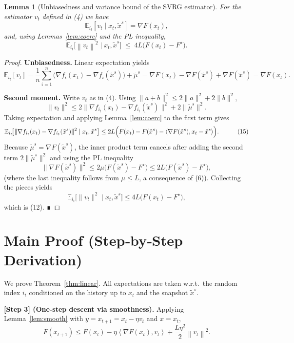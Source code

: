 \documentclass{article}
\newtheorem{lemma}{Lemma}
\newcommand{\E}{\mathbb{E}}
\newcommand{\norm}[1]{\left\|#1\right\|}
\newcommand{\inner}[2]{\left\langle #1,#2\right\rangle}
\begin{document}
\begin{lemma}[Unbiasedness and variance bound of the SVRG estimator]\label{lem:var}
For the estimator $v_t$ defined in (4) we have
\[
\E_{i_t}[v_t\mid x_t,\tilde{x}^{s}]=\nabla F(x_t),
\tag{11}
\]
and, using Lemmas~\ref{lem:coerc} and the PL inequality,
\[
\E_{i_t}\!\bigl[\norm{v_t}^{2}\mid x_t,\tilde{x}^{s}\bigr]
\;\le\;4L\bigl(F(x_t)-F^{\star}\bigr).
\tag{12}
\]
\end{lemma}
\begin{proof}
\textbf{Unbiasedness.}  Linear expectation yields
\[
\E_{i_t}[v_t]
 =\frac{1}{n}\sum_{i=1}^{n}\bigl(\nabla f_i(x_t)-\nabla f_i(\tilde{x}^{s})\bigr)+\tilde{\mu}^{s}
 =\nabla F(x_t)-\nabla F(\tilde{x}^{s})+\nabla F(\tilde{x}^{s})
 =\nabla F(x_t).
\tag{13}
\]

\textbf{Second moment.}  Write $v_t$ as in (4).  Using $\|a+b\|^{2}\le2\|a\|^{2}+2\|b\|^{2}$,
\[
\|v_t\|^{2}\le 2\|\nabla f_{i_t}(x_t)-\nabla f_{i_t}(\tilde{x}^{s})\|^{2}
          +2\|\tilde{\mu}^{s}\|^{2}.
\tag{14}
\]
Taking expectation and applying Lemma~\ref{lem:coerc} to the first term gives
\[
\begin{aligned}
\E_{i_t}\!\bigl[\|\nabla f_{i_t}(x_t)-\nabla f_{i_t}(\tilde{x}^{s})\|^{2}\mid x_t,\tilde{x}^{s}\bigr]
 &\le 2L\Bigl(F(x_t)-F(\tilde{x}^{s})
      -\inner{\nabla F(\tilde{x}^{s})}{x_t-\tilde{x}^{s}}\Bigr).
\end{aligned}
\tag{15}
\]
Because $\tilde{\mu}^{s}=\nabla F(\tilde{x}^{s})$, the inner product term cancels after adding the second term $2\|\tilde{\mu}^{s}\|^{2}$ and using the PL inequality
\[
\|\nabla F(\tilde{x}^{s})\|^{2}\le 2\mu\bigl(F(\tilde{x}^{s})-F^{\star}\bigr)
\le 2L\bigl(F(\tilde{x}^{s})-F^{\star}\bigr),
\tag{16}
\]
(where the last inequality follows from $\mu\le L$, a consequence of (6)).  
Collecting the pieces yields
\[
\E_{i_t}\!\bigl[\|v_t\|^{2}\mid x_t,\tilde{x}^{s}\bigr]
\le 4L\bigl(F(x_t)-F^{\star}\bigr),
\]
which is (12).  ∎
\end{proof}

\section*{Main Proof (Step‑by‑Step Derivation)}
We prove Theorem~\ref{thm:linear}.  
All expectations are taken w.r.t.\ the random index $i_t$ conditioned on the history up to $x_t$ and the snapshot $\tilde{x}^{s}$.

\medskip
\textbf{[Step 3] (One‑step descent via smoothness).}  
Applying Lemma~\ref{lem:smooth} with $y=x_{t+1}=x_t-\eta v_t$ and $x=x_t$,
\[
F(x_{t+1})\le F(x_t)-\eta\inner{\nabla F(x_t)}{v_t}
           +\frac{L\eta^{2}}{2}\norm{v_t}^{2}.
\tag{17}
\]
\end{document}
